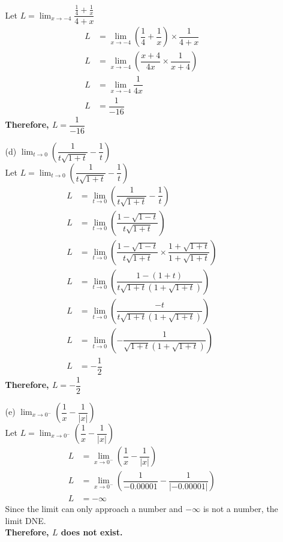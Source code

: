 \documentclass[12pt]{book}
\begin{document}
\begin{enumerate}
\begin{enumerate}
Let $L = \lim_{x\to -4}\limits \dfrac{\frac{1}{4}+\frac{1}{x}}{4+x}$
\begin{align}
    L &= \lim_{x\to -4}\limits \left(\dfrac{1}{4}+\dfrac{1}{x}\right)\times \dfrac{1}{4+x} \\
    L &= \lim_{x\to -4}\limits \left(\dfrac{x+4}{4x}\times\dfrac{1}{x+4}\right) \\
    L &= \lim_{x\to -4}\limits \dfrac{1}{4x} \\
    L &= \dfrac{1}{-16}
\end{align}
\textbf{Therefore, $L = \dfrac{1}{-16}$}
\setcounter{equation}{0}
\item[(d)] $\lim_{t\to 0}\limits \left(\dfrac{1}{t\sqrt{1+t}} - \dfrac{1}{t}\right)$ \\
Let $L = \lim_{t\to 0}\limits \left(\dfrac{1}{t\sqrt{1+t}} - \dfrac{1}{t}\right)$
\begin{align}
    L &= \lim_{t\to 0}\limits \left(\dfrac{1}{t\sqrt{1+t}} - \dfrac{1}{t}\right)\\
    L &= \lim_{t\to 0}\limits \left(\dfrac{1-\sqrt{1-t}}{t\sqrt{1+t}}\right)\\
    L &= \lim_{t\to 0}\limits \left(\dfrac{1-\sqrt{1-t}}{t\sqrt{1+t}}\times\dfrac{1+\sqrt{1+t}}{1+\sqrt{1+t}}\right)\\
    L &= \lim_{t\to 0}\limits \left(\dfrac{1-(1+t)}{t\sqrt{1+t}(1+\sqrt{1+t})}\right)\\
    L &= \lim_{t\to 0}\limits \left(\dfrac{-t}{t\sqrt{1+t}(1+\sqrt{1+t})}\right)\\
    L &= \lim_{t\to 0}\limits \left(-\dfrac{1}{\sqrt{1+t}(1+\sqrt{1+t})}\right)\\
    L &= -\dfrac{1}{2}
\end{align}
\textbf{Therefore, $L = -\dfrac{1}{2}$}
\setcounter{equation}{0}
\item[(e)] $\lim_{x\to 0^-}\limits \left(\dfrac{1}{x} - \dfrac{1}{|x|}\right)$\\
Let $L = \lim_{x\to 0^-}\limits \left(\dfrac{1}{x} - \dfrac{1}{|x|}\right)$
\begin{align}
    L &= \lim_{x\to 0^-}\limits \left(\dfrac{1}{x} - \dfrac{1}{|x|}\right) \\
    L &= \lim_{x\to 0^-}\limits \left(\dfrac{1}{-0.00001} - \dfrac{1}{|-0.00001|}\right) \\
    L &= -\infty
\end{align}
Since the limit can only approach a number and $-\infty$ is not a number, the limit DNE.\\
\textbf{Therefore, $L$ does not exist.}
\end{enumerate}
\setcounter{equation}{0}
\newpage


\end{enumerate}
\end{document}
